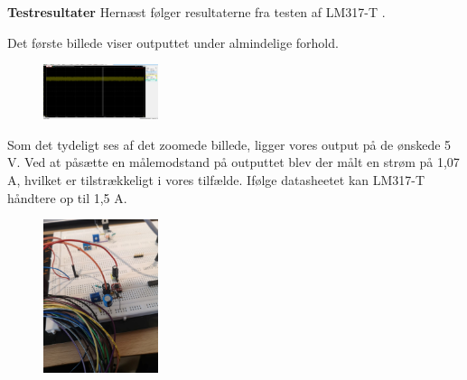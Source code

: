 
\textbf{Testresultater}\newline
Hernæst følger resultaterne fra testen af LM317-T .

Det første billede viser outputtet under almindelige forhold.
\begin{figure}[h]
  \centering
  \includegraphics[width=0.3\textwidth]{bil4.png}
  \caption{}
  \label{fig:bil4}
\end{figure}


\clearpage
Som det tydeligt ses af det zoomede billede, ligger vores output på de ønskede 5 V. Ved at påsætte en målemodstand på outputtet blev der målt en strøm på 1,07 A, hvilket er tilstrækkeligt i vores tilfælde. Ifølge datasheetet kan LM317-T håndtere op til 1,5 A.

\begin{figure}[h]
  \centering
  \includegraphics[width=0.3\textwidth]{bil6.jpg}
  \caption{}
  \label{fig:bil6}
\end{figure}

